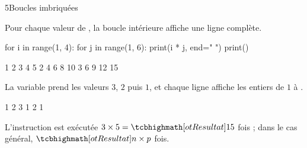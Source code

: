 \begin{corrige}{5}{Boucles imbriquées}
\begin{questions}
  \item Pour chaque valeur de , la boucle intérieure affiche une ligne complète.
\begin{codecote}[0.48]
\begin{pythoncol}
for i in range(1, 4):
    for j in range(1, 6):
        print(i * j, end=" ")
    print()
\end{pythoncol}
\cote
\begin{consolecol}
1 2 3 4 5
2 4 6 8 10
3 6 9 12 15
\end{consolecol}
\end{codecote}
  \item La variable  prend les valeurs $3$, $2$ puis $1$, et chaque ligne affiche les entiers de $1$ à .
\begin{console}
1 2 3
1 2
1
\end{console}
  \item L'instruction est exécutée $3\times5=\res{15}$ fois ; dans le cas général, $\res{n\times p}$ fois.
\end{questions}
\end{corrige}

